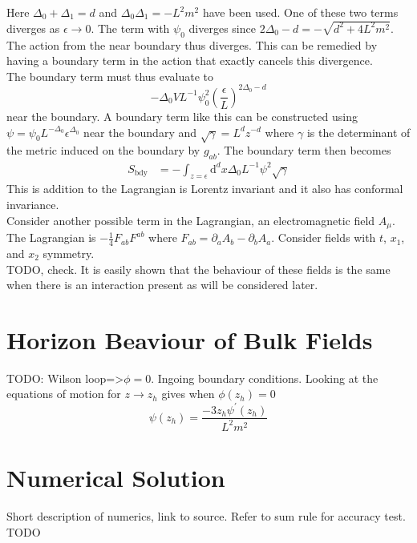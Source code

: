 \documentclass[12pt]{report}
\renewcommand{\d}{\ensuremath{\mathrm{d}}}
\newcommand{\At}{\ensuremath{{\phi}}}
\begin{document}
Here $\Delta_0+\Delta_1=d$ and $\Delta_0\Delta_1=-L^2m^2$ have been used. One of these two terms diverges as $\epsilon\rightarrow0$. The term with $\psi_0$ diverges since $2\Delta_0-d=-\sqrt{d^2+4L^2m^2}$. The action from the near boundary thus diverges. This can be remedied by having a boundary term in the action that exactly cancels this divergence.\\
The boundary term must thus evaluate to
\begin{equation}
-\Delta_0VL^{-1}\psi_0^2\left(\frac{\epsilon}{L}\right)^{2\Delta_0-d}
\end{equation}
near the boundary. A boundary term like this can be constructed using $\psi=\psi_0L^{-\Delta_0}\epsilon^{\Delta_0}$ near the boundary and $\sqrt{\gamma}=L^dz^{-d}$ where $\gamma$ is the determinant of the metric induced on the boundary by $g_{ab}$.
The boundary term then becomes
\begin{equation}
\begin{split}
 S_{\mathrm{bdy}}&=-\int_{z=\epsilon}\d^dx\Delta_0L^{-1}\psi^2\sqrt{\gamma}
\label{Sbdy}
\end{split}
\end{equation}
This is addition to the Lagrangian is Lorentz invariant and it also has conformal invariance.
\\
Consider another possible term in the Lagrangian, an electromagnetic field $A_\mu$. The Lagrangian is $-\frac{1}{4}F_{ab}F^{ab}$ where $F_{ab}=\partial_aA_b-\partial_bA_a$. Consider fields with $t$, $x_1$, and $x_2$ symmetry.
\\
TODO, check. It is easily shown that the behaviour of these fields is the same when there is an interaction present as will be considered later.
\section{Horizon Beaviour of Bulk Fields}
TODO: Wilson loop=>$\At=0$. Ingoing boundary conditions.
Looking at the equations of motion for $z\rightarrow z_h$ gives when $\At(z_h)=0$
\begin{equation}
 \psi(z_h)=\frac{-3z_h\psi^\prime(z_h)}{L^2m^2}
\end{equation}
\section{Numerical Solution}
Short description of numerics, link to source. Refer to sum rule for accuracy test. TODO
\end{document}
